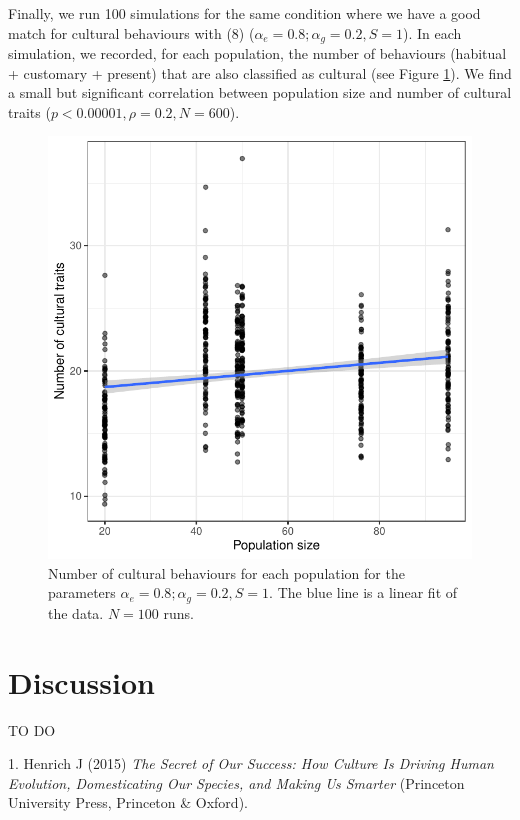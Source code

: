 \documentclass[9pt,twocolumn,twoside,]{pnas-new}
\begin{document}
Finally, we run 100 simulations for the same condition where we have a
good match for cultural behaviours with (8)
(\(\alpha_e=0.8;\alpha_g=0.2, S=1\)). In each simulation, we recorded,
for each population, the number of behaviours (habitual + customary +
present) that are also classified as cultural (see Figure
\ref{Figure4}). We find a small but significant correlation between
population size and number of cultural traits
(\(p<0.00001,\rho=0.2,N=600\)).

\begin{figure}[h!]
\begin{center}
\includegraphics[width=11.4cm]{figures/figure_4.pdf}
\caption{Number of cultural behaviours for each population for the parameters $\alpha_e=0.8;\alpha_g=0.2,S=1$. The blue line is a linear fit of the data. $N=100$ runs.}
\label{Figure4}
\end{center}
\end{figure}

\section*{Discussion}\label{discussion}

TO DO

\showmatmethods
\showacknow
\pnasbreak

\hypertarget{refs}{}
\hypertarget{ref-henrich_secret_2015}{}
1. Henrich J (2015) \emph{The Secret of Our Success: How Culture Is
Driving Human Evolution, Domesticating Our Species, and Making Us
Smarter} (Princeton University Press, Princeton \& Oxford).
\end{document}
